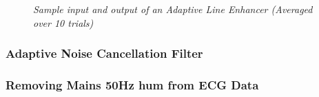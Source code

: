 \documentclass[./main.tex]{subfiles}
\begin{document}
\begin{figure}[h]
\centering 
\resizebox{\textwidth}{!}{}
\caption{\textit{Sample input and output of an Adaptive Line Enhancer (Averaged over 10 trials)}}
\label{fig:3_3_b_overview}
\end{figure}


\subsubsection{Adaptive Noise Cancellation Filter}


\subsubsection{Removing Mains 50Hz hum from ECG Data}


%  	


 		
         
 		
\end{document}
